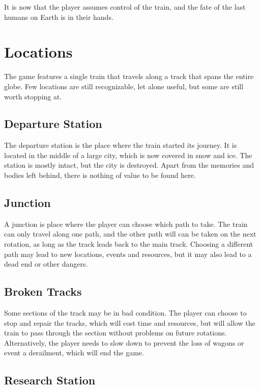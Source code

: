 It is now that the player assumes control of the train, and the fate of the last humans on Earth is in their hands.

\section{Locations}

The game features a single train that travels along a track that spans the entire globe.
Few locations are still recognizable, let alone useful, but some are still worth stopping at.

\subsection{Departure Station}

The departure station is the place where the train started its journey.
It is located in the middle of a large city, which is now covered in snow and ice.
The station is mostly intact, but the city is destroyed.
Apart from the memories and bodies left behind, there is nothing of value to be found here.

\subsection{Junction}

A junction is place where the player can choose which path to take.
The train can only travel along one path, and the other path will can be taken on the next rotation, as long as the track leads back to the main track.
Choosing a different path may lead to new locations, events and resources, but it may also lead to a dead end or other dangers.

\subsection{Broken Tracks}

Some sections of the track may be in bad condition.
The player can choose to stop and repair the tracks, which will cost time and resources, but will allow the train to pass through the section without problems on future rotations.
Alternatively, the player needs to slow down to prevent the loss of wagons or event a derailment, which will end the game.

\subsection{Research Station}

